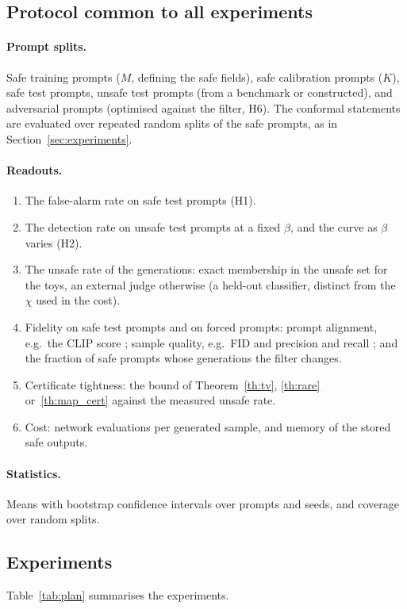 \documentclass{article}
\theoremstyle{plain}
\begin{document}
\subsection{Protocol common to all experiments}\label{subsec:protocol}
\paragraph{Prompt splits.} Safe training prompts ($M$, defining the safe fields), safe calibration prompts
($K$), safe test prompts, unsafe test prompts (from a benchmark or constructed), and adversarial prompts
(optimised against the filter, H6). The conformal statements are evaluated over repeated random splits of
the safe prompts, as in Section~\ref{sec:experiments}.
\paragraph{Readouts.}
\begin{enumerate}
\item The false-alarm rate on safe test prompts (H1).
\item The detection rate on unsafe test prompts at a fixed $\beta$, and the curve as $\beta$ varies (H2).
\item The unsafe rate of the generations: exact membership in the unsafe set for the toys, an external judge
otherwise (a held-out classifier, distinct from the $\chi$ used in the cost).
\item Fidelity on safe test prompts and on forced prompts: prompt alignment, e.g.\ the CLIP score
\citep{radford2021learning}; sample quality, e.g.\ FID \citep{heusel2017gans} and precision and recall
\citep{kynkaanniemi2019improved}; and the fraction of safe prompts whose generations the filter changes.
\item Certificate tightness: the bound of Theorem~\ref{th:tv}, \ref{th:rare} or~\ref{th:map_cert} against the measured
unsafe rate.
\item Cost: network evaluations per generated sample, and memory of the stored safe outputs.
\end{enumerate}
\paragraph{Statistics.} Means with bootstrap confidence intervals over prompts and seeds, and coverage over
random splits.

\subsection{Experiments}\label{subsec:experiments_plan}
Table~\ref{tab:plan} summarises the experiments.
\end{document}
